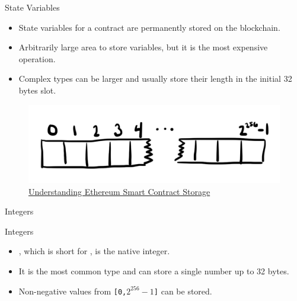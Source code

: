 \documentclass[handout]{beamer}
\begin{document}
\begin{frame}{State Variables}

	\begin{itemize}
		\item State variables for a contract are permanently stored on the blockchain.
		\item Arbitrarily large area to store variables, but it is the most expensive operation.
		\item Complex types can be larger and usually store their length in the initial 32 bytes slot.
	\end{itemize}
	
	\begin{figure}
		\includegraphics[scale=0.2]{../assets/images/sc_storage}
\caption{\link \href{https://programtheblockchain.com/posts/2018/03/09/understanding-ethereum-smart-contract-storage/}{Understanding Ethereum Smart Contract Storage}}
		\label{fig:sc_storage}
	\end{figure}

\end{frame}

\begin{frame}{Integers}

	\begin{samplecode}{Integers}
		
	\end{samplecode}
	\begin{itemize}
		\item<2->{, which is short for , is the native integer.}
		\item<3->{It is the most common type and can store a single number up to 32 bytes.}
		\item<4->{Non-negative values from \texttt{[0,$2^{256}-1$]} can be stored.}
	\end{itemize}

\end{frame}
\end{document}
